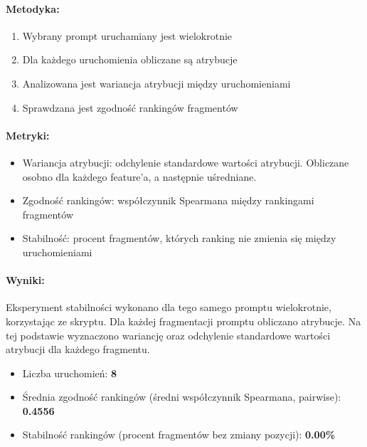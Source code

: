 \documentclass[12pt,a4paper]{article}
\begin{document}
\paragraph{Metodyka:}
\begin{enumerate}
    \item Wybrany prompt uruchamiany jest wielokrotnie
    \item Dla każdego uruchomienia obliczane są atrybucje
    \item Analizowana jest wariancja atrybucji między uruchomieniami
    \item Sprawdzana jest zgodność rankingów fragmentów
\end{enumerate}

\paragraph{Metryki:}
\begin{itemize}
    \item Wariancja atrybucji: odchylenie standardowe wartości atrybucji. Obliczane osobno dla każdego feature'a, a następnie uśredniane.
    \item Zgodność rankingów: współczynnik Spearmana między rankingami fragmentów
    \item Stabilność: procent fragmentów, których ranking nie zmienia się między uruchomieniami
\end{itemize}

\paragraph{Wyniki:}

Eksperyment stabilności wykonano dla tego samego promptu wielokrotnie, korzystając ze skryptu. Dla każdej fragmentacji promptu obliczano atrybucje. Na tej podstawie wyznaczono wariancję oraz odchylenie standardowe wartości atrybucji dla każdego fragmentu.
\begin{itemize}
    \item Liczba uruchomień: \textbf{8}
    \item Średnia zgodność rankingów (średni współczynnik Spearmana, pairwise): \textbf{0.4556}
    \item Stabilność rankingów (procent fragmentów bez zmiany pozycji): \textbf{0.00\%}
\end{itemize}

\end{document}
